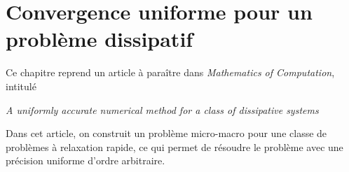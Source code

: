 
\clearemptydoublepage
\chapter{Convergence uniforme pour un problème dissipatif}
\label{chap:dissip-mima}

Ce chapitre reprend un article à paraître dans \textit{Mathematics of
Computation}, intitulé 
\begin{center}\itshape%
  A uniformly accurate numerical method for a class of dissipative
  systems
\end{center}
Dans cet article, on construit un problème micro-macro pour une classe de problèmes à relaxation rapide, ce qui permet de résoudre le problème avec une précision uniforme d'ordre arbitraire. 




















